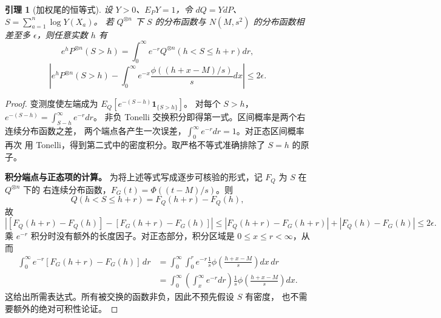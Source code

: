 \documentclass[UTF8,a4paper,11pt,fontset=fandol]{ctexart}
\newtheorem{lemma}{引理}[section]
\theoremstyle{remark}
\begin{document}
\begin{lemma}[加权尾的恒等式]\label{lem:paperweighted}
设 $Y>0$、$E_PY=1$，令 $dQ=YdP$、$S=\sum_{a=1}^n\log Y(X_a)$。
若 $Q^{\otimes n}$ 下 $S$ 的分布函数与 $N(M,s^2)$ 的分布函数相差至多
$\epsilon$，则任意实数 $h$ 有
\[
 e^hP^{\otimes n}(S>h)
 =\int_0^\infty e^{-r}Q^{\otimes n}(h<S\le h+r)dr,
\]
\[
 \left|e^hP^{\otimes n}(S>h)
 -\int_0^\infty e^{-x}\frac{\phi((h+x-M)/s)}s dx\right|\le2\epsilon.
\]
\end{lemma}
\begin{proof}
变测度使左端成为 $E_Q[e^{-(S-h)}\mathbf1_{\{S>h\}}]$。
对每个 $S>h$，$e^{-(S-h)}=\int_{S-h}^\infty e^{-r}dr$。
非负 Tonelli 交换积分即得第一式。区间概率是两个右连续分布函数之差，
两个端点各产生一次误差，$\int_0^\infty e^{-r}dr=1$。对正态区间概率再次
用 Tonelli，得到第二式中的密度积分。取严格不等式准确排除了 $S=h$ 的原子。

\medskip\noindent\textbf{积分端点与正态项的计算。}
为将上述等式写成逐步可核验的形式，记 $F_Q$ 为 $S$ 在 $Q^{\otimes n}$ 下的
右连续分布函数，$F_G(t)=\Phi((t-M)/s)$。则
\[
 Q(h<S\le h+r)=F_Q(h+r)-F_Q(h),
\]
故
\[
 \left|[F_Q(h+r)-F_Q(h)]-[F_G(h+r)-F_G(h)]\right|
 \le |F_Q(h+r)-F_G(h+r)|+|F_Q(h)-F_G(h)|\le2\epsilon.
\]
乘 $e^{-r}$ 积分时没有额外的长度因子。对正态部分，积分区域是
$0\le x\le r<\infty$，从而
\begin{align*}
 \int_0^\infty e^{-r}[F_G(h+r)-F_G(h)]\,dr
 &=\int_0^\infty\int_0^r e^{-r}\frac1s
       \phi\!\left(\frac{h+x-M}{s}\right)dx\,dr\\
 &=\int_0^\infty\left(\int_x^\infty e^{-r}dr\right)
       \frac1s\phi\!\left(\frac{h+x-M}{s}\right)dx.
\end{align*}
这给出所需表达式。所有被交换的函数非负，因此不预先假设 $S$ 有密度，
也不需要额外的绝对可积性论证。

\end{proof}
\end{document}
